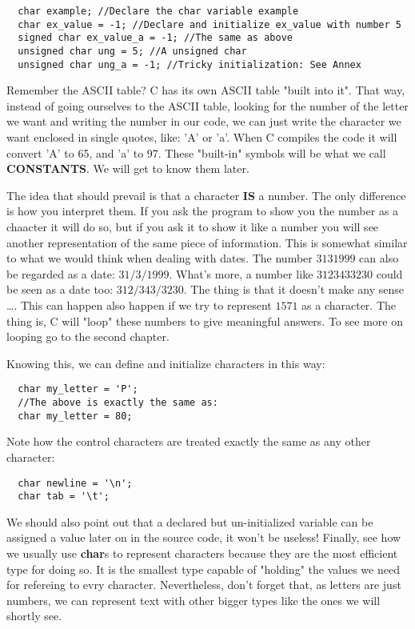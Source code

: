 \documentclass[12pt]{book}
\begin{document}
\begin{verbatim}
  char example; //Declare the char variable example
  char ex_value = -1; //Declare and initialize ex_value with number 5
  signed char ex_value_a = -1; //The same as above
  unsigned char ung = 5; //A unsigned char
  unsigned char ung_a = -1; //Tricky initialization: See Annex
\end{verbatim}

Remember the ASCII table? C has its own ASCII table "built into it". That way, instead of going ourselves to the ASCII table, looking for the number of the letter we want and writing the number in our code, we can just write the character we want enclosed in single quotes, like: 'A' or 'a'. When C compiles the code it will convert 'A' to 65, and 'a' to 97. These "built-in" symbols will be what we call \textbf{CONSTANTS}. We will get to know them later.

The idea that should prevail is that a character \textbf{IS} a number. The only difference is how you interpret them. If you ask the program to show you the number as a chaacter it will do so, but if you ask it to show it like a number you will see another representation of the same piece of information. This is somewhat similar to what we would think when dealing with dates. The number $3131999$ can also be regarded as a date: $31/3/1999$. What's more, a number like $3123433230$ could be seen as a date too: $312/343/3230$. The thing is that it doesn't make any sense \dots. This can happen also happen if we try to represent $1571$ as a character. The thing is, C will "loop" these numbers to give meaningful answers. To see more on looping go to the second chapter.

Knowing this, we can define and initialize characters in this way:

\begin{verbatim}
  char my_letter = 'P';
  //The above is exactly the same as:
  char my_letter = 80;
\end{verbatim}

Note how the control characters are treated exactly the same as any other character:

\begin{verbatim}
  char newline = '\n';
  char tab = '\t';
\end{verbatim}

We should also point out that a declared but un-initialized variable can be assigned a value later on in the source code, it won't be useless! Finally, see how we usually use \textbf{char}s to represent characters because they are the most efficient type for doing so. It is the smallest type capable of "holding" the values we need for refereing to evry character. Nevertheless, don't forget that, as letters are just numbers, we can represent text with other bigger types like the ones we will shortly see.
\end{document}
